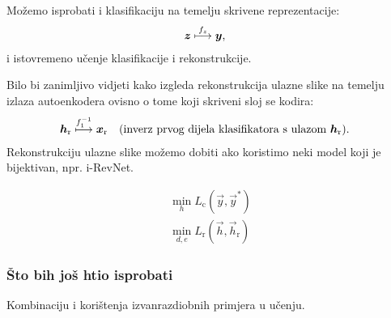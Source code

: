 \documentclass[twocolumn]{article}
\begin{document}
Možemo isprobati i klasifikaciju na temelju skrivene reprezentacije:
\begin{align}
    &\vec z \overset{f_z}{\longmapsto} \vec y \text,
\end{align}
i istovremeno učenje klasifikacije i rekonstrukcije.

Bilo bi zanimljivo vidjeti kako izgleda rekonstrukcija ulazne slike na temelju izlaza autoenkodera ovisno o tome koji skriveni sloj se kodira:
\begin{align}
    &\vec h_\text{r} \overset{f_1^{-1}}{\longmapsto} \vec x_\text{r}
    \quad \text{(inverz prvog dijela klasifikatora s ulazom $\vec h_\text{r}$)} \text.
\end{align}
Rekonstrukciju ulazne slike možemo dobiti ako koristimo neki model koji je bijektivan, npr. i-RevNet.


\begin{align}
    \min_{h} L_\text{c}(\vec y, \vec y^*) \\
    \min_{d, e} L_\text{r}(\vec h,\vec h_\text{r})
\end{align}

\subsubsection{Što bih još htio isprobati}

Kombinaciju \cite{Lee:2017:TCCCDOOD} i korištenja izvanrazdiobnih primjera u učenju.


 
%
\end{document}
